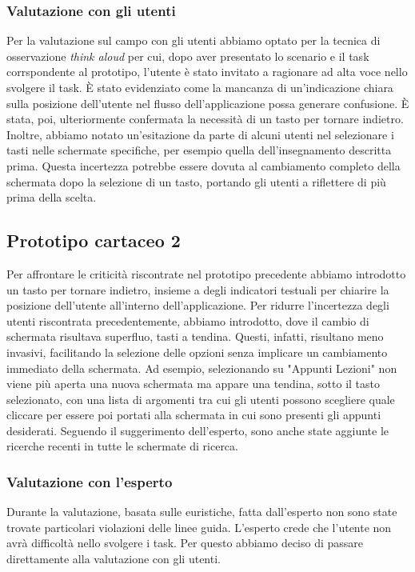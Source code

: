 \subsubsection{Valutazione con gli utenti}
Per la valutazione sul campo con gli utenti abbiamo optato per la tecnica di osservazione \textit{think aloud} per cui, dopo aver presentato lo scenario
e il task corrspondente al prototipo, l'utente è stato invitato a ragionare ad alta voce nello svolgere il task. È stato evidenziato come la mancanza
di un'indicazione chiara sulla posizione dell'utente nel flusso dell'applicazione possa generare confusione. È stata, poi, ulteriormente confermata la necessità di
un tasto per tornare indietro.
Inoltre, abbiamo notato un'esitazione da parte di alcuni utenti nel selezionare i tasti nelle schermate specifiche, per esempio quella dell'insegnamento descritta
prima. Questa incertezza potrebbe essere dovuta al cambiamento completo della schermata dopo la selezione di un tasto, portando gli utenti a riflettere di più prima della scelta.


\subsection{Prototipo cartaceo 2}
Per affrontare le criticità riscontrate nel prototipo precedente abbiamo introdotto un tasto per tornare indietro, insieme a degli indicatori testuali per chiarire
la posizione dell'utente all'interno dell'applicazione.
Per ridurre l'incertezza degli utenti riscontrata precedentemente, abbiamo introdotto, dove il cambio di schermata risultava superfluo, tasti a tendina. Questi,
infatti, risultano meno invasivi, facilitando la selezione delle opzioni senza implicare un cambiamento immediato della schermata. Ad esempio, selezionando su
"Appunti Lezioni" non viene più aperta una nuova schermata ma appare una tendina, sotto il tasto selezionato, con una lista di argomenti tra cui gli utenti possono
scegliere quale cliccare per essere poi portati alla schermata in cui sono presenti gli appunti desiderati.
Seguendo il suggerimento dell'esperto, sono anche state aggiunte le ricerche recenti in tutte le schermate di ricerca.


\subsubsection{Valutazione con l'esperto}
Durante la valutazione, basata sulle euristiche, fatta dall’esperto non sono state trovate particolari violazioni delle linee guida. L’esperto crede che l’utente non avrà difficoltà nello svolgere i task.
Per questo abbiamo deciso di passare direttamente alla valutazione con gli utenti.


